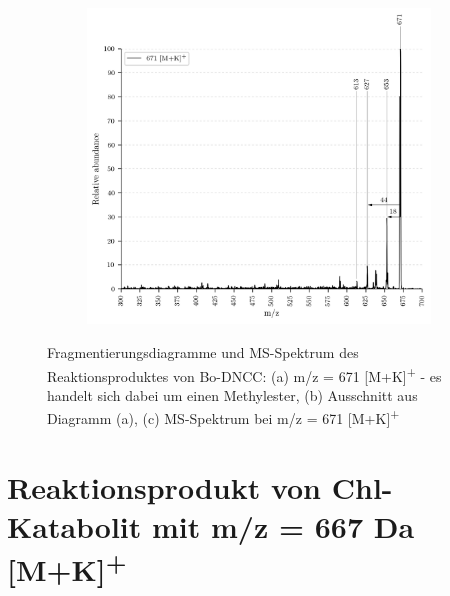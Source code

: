 \begin{figure}[!htbp]
  \begin{subfigure}[b]{\textwidth}
    \includegraphics[width=\textwidth, height=0.5\textheight]{content/Anhang/MSLeafspray/RP_Bo-DNCC/VWA_MS_LeafSpray_671.png}
    \caption{}
  \end{subfigure}
  
  \caption[Fragmentierungsdiagramme und MS-Spektrum des Reaktionsproduktes von Bo-DNCC, Quelle: Autor]{Fragmentierungsdiagramme und MS-Spektrum des Reaktionsproduktes von Bo-DNCC: (a) m/z = 671 [M+K]\textsuperscript{+} - es handelt sich dabei um einen Methylester, (b) Ausschnitt aus Diagramm (a), (c) MS-Spektrum bei m/z = 671 [M+K]\textsuperscript{+}}
\end{figure}

\pagebreak
\section{Reaktionsprodukt von Chl-Katabolit mit m/z = 667 Da [M+K]\textsuperscript{+}}

